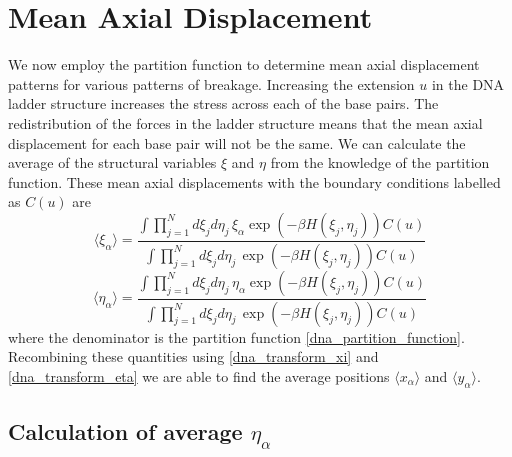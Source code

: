 \section{Mean Axial Displacement}
%
We now employ the partition function to determine mean axial displacement patterns for various patterns of breakage. Increasing the extension $u$ in the DNA ladder structure increases the stress across each of the base pairs. The redistribution of the forces in the ladder structure means that the mean axial displacement for each base pair will not be the same. We can calculate the average of the structural variables $\xi$ and $\eta$ from the knowledge of the partition function. These mean axial displacements with the boundary conditions labelled as $C\left(u\right)$ are
%
\begin{equation}
\label{dna_mxd_xi}
\langle\xi_{\alpha}\rangle=\frac{\int \prod^{N}_{j=1}d\xi_{j}d\eta_{j}\,\xi_{\alpha}\exp\left(-\beta H\left(\xi_{j},\eta_{j}\right)\right)C\left(u\right)}{\int \prod^{N}_{j=1}d\xi_{j}d\eta_{j}\,\exp\left(-\beta H\left(\xi_{j},\eta_{j}\right)\right)C\left(u\right)}
\end{equation}
%
\begin{equation}
\label{dna_mxd_eta}
\langle\eta_{\alpha}\rangle=\frac{\int \prod^{N}_{j=1}d\xi_{j}d\eta_{j}\,\eta_{\alpha}\exp\left(-\beta H\left(\xi_{j},\eta_{j}\right)\right)C\left(u\right)}{\int \prod^{N}_{j=1}d\xi_{j}d\eta_{j}\,\exp\left(-\beta H\left(\xi_{j},\eta_{j}\right)\right)C\left(u\right)}
\end{equation}
%
where the denominator is the partition function \eqref{dna_partition_function}. Recombining these quantities using \eqref{dna_transform_xi} and \eqref{dna_transform_eta} we are able to find the average positions $\langle x_{\alpha}\rangle$ and $\langle y_{\alpha}\rangle$.

\subsection{Calculation of average $\eta_{\alpha}$}

